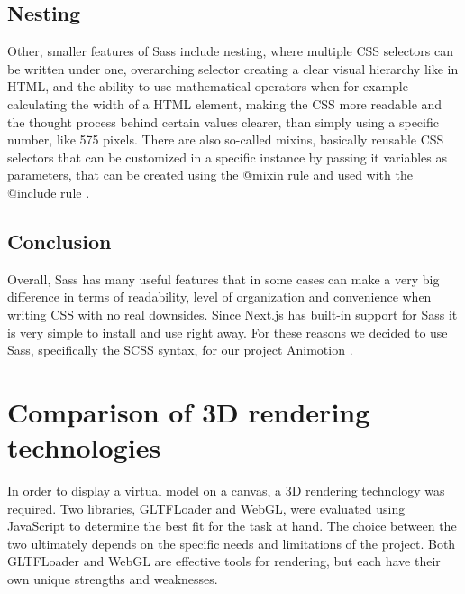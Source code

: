 \subsection{Nesting}
Other, smaller features of Sass include nesting, where multiple CSS selectors can be written under one, overarching selector creating a
clear visual hierarchy like in HTML, and the ability to use mathematical operators when for example calculating the width of a HTML
element, making the CSS more readable and the thought process behind certain values clearer, than simply using a specific number, like
575 pixels. There are also so-called mixins, basically reusable CSS selectors that can be customized in a specific instance by passing it
variables as parameters, that can be created using the @mixin rule and used with the @include rule \cite{SassFeatures}.
\\
\subsection{Conclusion}
Overall, Sass has many useful features that in some cases can make a very big difference in terms of readability, level of organization and
convenience when writing CSS with no real downsides. Since Next.js has built-in support for Sass it is very simple to install and use right
away. For these reasons we decided to use Sass, specifically the SCSS syntax, for our project Animotion \cite{NextjsCSSSupport}.
\\
\section{Comparison of 3D rendering technologies}
In order to display a virtual model on a canvas, a 3D rendering technology was required. Two libraries, 
GLTFLoader and WebGL, were evaluated using JavaScript to determine the best fit for the task at hand. 
The choice between the two ultimately depends on the specific needs and limitations of the project. 
Both GLTFLoader and WebGL are effective tools for rendering, but each have their own 
unique strengths and weaknesses.

